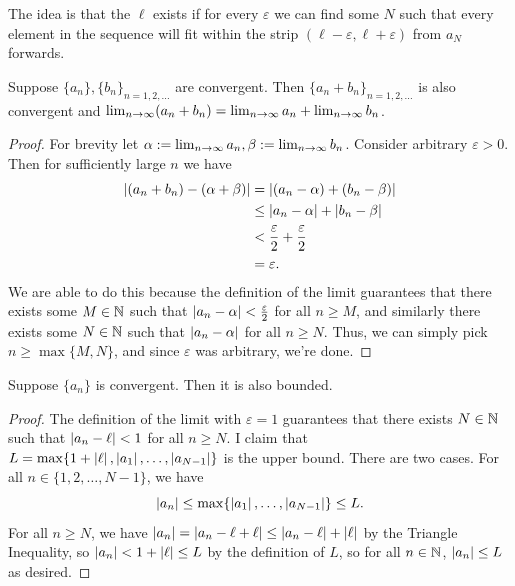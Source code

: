 \documentclass[main.tex]{subfiles}
\begin{document}
The idea is that the  $\ell$ exists if for every $\varepsilon$ we can find some $N$ such that every element in the sequence will fit within the strip $(\ell - \varepsilon, \ell + \varepsilon)$ from $a_N$ forwards.

\begin{theorem}
    Suppose $\{a_n\}, \{b_n\}_{n = 1, 2, \ldots}$ are convergent. Then $\{a_n + b_n\}_{n = 1, 2, \ldots}$ is also convergent and $\lim_{n\to \infty}(a_n + b_n) = \lim_{n\to \infty} a_n + \lim_{n\to \infty} b_n$.
\end{theorem}

\begin{proof}
    For brevity let $\alpha:= \lim_{n\to \infty} a_n, \beta:= \lim_{n\to \infty} b_n$. Consider arbitrary $\varepsilon > 0$. Then for sufficiently large $n$ we have
    \begin{align*}
        \left\lvert (a_n + b_n) - (\alpha + \beta) \right\rvert &= \left\lvert (a_n - \alpha) + (b_n - \beta) \right\rvert \\
        &\le \left\lvert a_n - \alpha \right\rvert + \left\lvert b_n - \beta \right\rvert \\
        &< \frac{\varepsilon}{2} + \frac{\varepsilon}{2} \\
        & = \varepsilon.
    \end{align*}
    We are able to do this because the definition of the limit guarantees that there exists some $M\in \mathbb N$ such that $\left\lvert a_n - \alpha \right\rvert < \frac{\varepsilon}{2}$ for all $n\ge M$, and similarly there exists some $N\in \mathbb N$ such that $\left\lvert a_n - \alpha \right\rvert$ for all $n\ge N$. Thus, we can simply pick $n\ge \max\{M, N\}$, and since $\varepsilon$ was arbitrary, we're done.
\end{proof}

\begin{theorem}
    Suppose $\{a_n\}$ is convergent. Then it is also bounded.
\end{theorem}
\begin{proof}
    The definition of the limit with $\varepsilon = 1$ guarantees that there exists $N\in \mathbb N$ such that $\left\lvert a_n - \ell \right\rvert < 1$ for all $n\ge N$. I claim that $L = \max \{1 + \left\lvert \ell \right\rvert, \left\lvert a_1 \right\rvert, \ldots , \left\lvert a_{N - 1} \right\rvert\}$ is the upper bound. There are two cases. For all $n\in \{1, 2, \ldots , N - 1\}$, we have
    \[\left\lvert a_n \right\rvert \le \max \{\left\lvert a_1 \right\rvert, \ldots , \left\lvert a_{N - 1} \right\rvert\}\le L.\]
    For all $n\ge N$, we have $\left\lvert a_n \right\rvert = \left\lvert a_n - \ell + \ell \right\rvert \le \left\lvert a_n - \ell \right\rvert + \left\lvert \ell \right\rvert$ by the Triangle Inequality, so $\left\lvert a_n \right\rvert < 1 + \left\lvert \ell \right\rvert\le L$ by the definition of $L$, so for all $n\in \mathbb N$, $\left\lvert a_n \right\rvert\le L$ as desired.
\end{proof}
\end{document}
